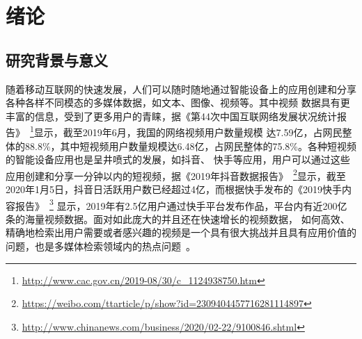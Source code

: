 \chapter{绪论}

\section{研究背景与意义}
随着移动互联网的快速发展，人们可以随时随地通过智能设备上的应用创建和分享各种各样不同模态的多媒体数据，如文本、图像、视频等。其中视频
数据具有更丰富的信息，受到了更多用户的青睐，据《第44次中国互联网络发展状况统计报告》~\footnote{\url{http://www.cac.gov.cn/2019-08/30/c\_1124938750.htm}}显示，截至2019年6月，我国的网络视频用户数量规模
达7.59亿，占网民整体的88.8\%，其中短视频用户数量规模达6.48亿，占网民整体的75.8\%。各种短视频的智能设备应用也是呈井喷式的发展，如抖音、
快手等应用，用户可以通过这些应用创建和分享一分钟以内的短视频，据《2019年抖音数据报告》~\footnote{\url{https://weibo.com/ttarticle/p/show?id=2309404457716281114897}}显示，截至2020年1月5日，抖音日活跃用户数已经超过4亿，而根据快手发布的《2019快手内容报告》~\footnote{\url{http://www.chinanews.com/business/2020/02-22/9100846.shtml}}
显示，2019年有2.5亿用户通过快手平台发布作品，平台内有近200亿条的海量视频数据。面对如此庞大的并且还在快速增长的视频数据，
如何高效、精确地检索出用户需要或者感兴趣的视频是一个具有很大挑战并且具有应用价值的问题，也是多媒体检索领域内的热点问题~\cite{hong2017,geetha2008a,hu2011a,peng2018an}。

